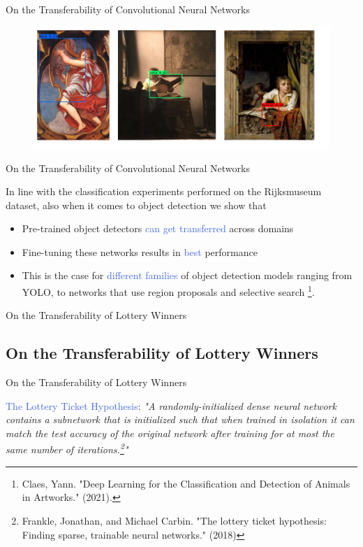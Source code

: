 \documentclass{beamer}
\begin{document}
\begin{frame}{On the Transferability of Convolutional Neural Networks}
	\begin{figure}
		\includegraphics[width=1\textwidth]{figures/minerva}
	\end{figure}
\end{frame}


\begin{frame}{On the Transferability of Convolutional Neural Networks}
	
	In line with the classification experiments performed on the Rijksmuseum dataset, also when it comes to object detection we show that
	\bigskip
	\begin{itemize}
		\item Pre-trained object detectors \textcolor{RoyalBlue}{can get transferred} across domains 
		\item Fine-tuning these networks results in \textcolor{RoyalBlue}{best} performance
		\item This is the case for \textcolor{RoyalBlue}{different families} of object detection models ranging from YOLO, to networks that use region proposals and selective search \footnote{Claes, Yann. "Deep Learning for the Classification and Detection of Animals in Artworks." (2021).}.
	\end{itemize}

\end{frame}



\begin{frame}{On the Transferability of Lottery Winners}
	\subsection{On the Transferability of Lottery Winners}
\end{frame}


\begin{frame}{On the Transferability of Lottery Winners}

	\begin{center}
		\textcolor{RoyalBlue}{The Lottery Ticket Hypothesis}:
		\textit{"A randomly-initialized dense neural network contains a subnetwork that is initialized such that when trained in isolation it can match the test accuracy of the original network after training for at most the same number of iterations.\footnote{Frankle, Jonathan, and Michael Carbin. "The lottery ticket hypothesis: Finding sparse, trainable neural networks." (2018)}"}
	\end{center}

\end{frame}
\end{document}

